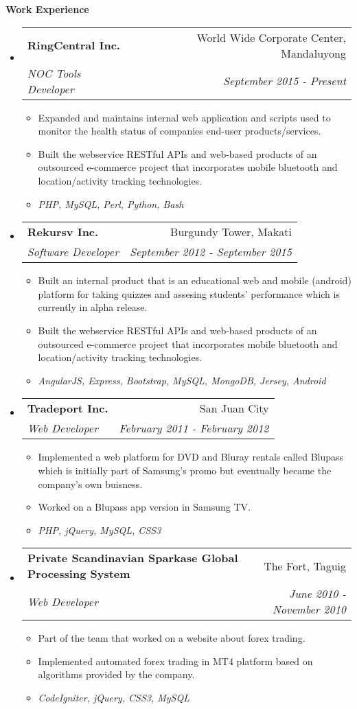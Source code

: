 \documentclass[letterpaper,11pt]{article}
\makeatletter
\newcommand{\resitem}[1]{\item #1 \vspace{-2pt}}
\newcommand{\resheading}[1]{{\large \colorbox{mygrey}{\begin{minipage}{\textwidth}{\textbf{#1 \vphantom{p\^{E}}}}\end{minipage}}}}
\newcommand{\ressubheading}[4]{
\begin{tabular*}{7.0in}{l@{\extracolsep{\fill}}r}
		\textbf{#1} & #2 \\
		\textit{#3} & \textit{#4} \\
\end{tabular*}\vspace{-6pt}}
\makeatother
\begin{document}
\resheading{Work Experience}
\begin{itemize}
\item
	\ressubheading{RingCentral Inc.}{World Wide Corporate Center, Mandaluyong}{NOC Tools Developer}{September 2015 - Present}
	\begin{itemize}
        \resitem{Expanded and maintains internal web application and scripts used to monitor the health status of companies end-user products/services.}
		\resitem{Built the webservice RESTful APIs and web-based products of an outsourced e-commerce project that incorporates mobile bluetooth and location/activity tracking technologies.}
        \resitem{\textit{PHP, MySQL, Perl, Python, Bash}}
	\end{itemize}
\item
	\ressubheading{Rekursv Inc.}{Burgundy Tower, Makati}{Software Developer}{September 2012 - September 2015}
	\begin{itemize}
        \resitem{Built an internal product that is an educational web and mobile (android) platform for taking quizzes and assesing students' performance which is currently in alpha release.}
		\resitem{Built the webservice RESTful APIs and web-based products of an outsourced e-commerce project that incorporates mobile bluetooth and location/activity tracking technologies.}
        \resitem{\textit{AngularJS, Express, Bootstrap, MySQL, MongoDB, Jersey, Android}}
	\end{itemize}
\item
	\ressubheading{Tradeport Inc.}{San Juan City}{Web Developer}{February 2011 - February 2012}
	\begin{itemize}
		\resitem{Implemented a web platform for DVD and Bluray rentals called Blupass which is initially part of Samsung's promo but eventually became the company's own buisness.}
		\resitem{Worked on a Blupass app version in Samsung TV.}
        \resitem{\textit{PHP, jQuery, MySQL, CSS3}}
	\end{itemize}
\item
	\ressubheading{Private Scandinavian Sparkase Global Processing System}{The Fort, Taguig}{Web Developer}{June 2010 - November 2010}
	\begin{itemize}
		\resitem{Part of the team that worked on a website about forex trading.}
		\resitem{Implemented automated forex trading in MT4 platform based on algorithms provided by the company.}
        \resitem{\textit{CodeIgniter, jQuery, CSS3, MySQL}}
	\end{itemize}
\end{itemize}
\end{document}
